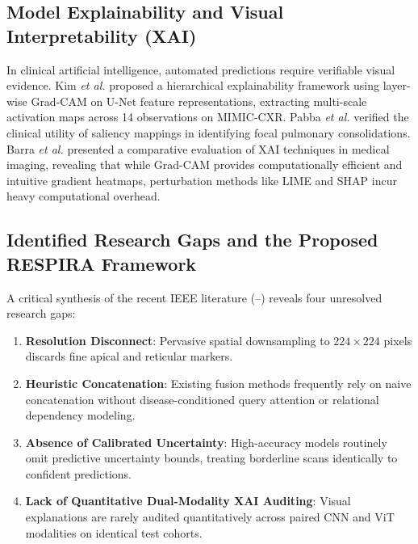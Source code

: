 \documentclass[journal]{IEEEtran}
\begin{document}
\subsection{Model Explainability and Visual Interpretability (XAI)}
In clinical artificial intelligence, automated predictions require verifiable visual evidence. Kim \textit{et al.} \cite{kim2025explainable} proposed a hierarchical explainability framework using layer-wise Grad-CAM on U-Net feature representations, extracting multi-scale activation maps across 14 observations on MIMIC-CXR. Pabba \textit{et al.} \cite{pabba2025explainable} verified the clinical utility of saliency mappings in identifying focal pulmonary consolidations. Barra \textit{et al.} \cite{barra2024comparative} presented a comparative evaluation of XAI techniques in medical imaging, revealing that while Grad-CAM provides computationally efficient and intuitive gradient heatmaps, perturbation methods like LIME and SHAP incur heavy computational overhead.

\subsection{Identified Research Gaps and the Proposed RESPIRA Framework}
A critical synthesis of the recent IEEE literature (\cite{shukla2026chest}--\cite{yaligar2024state}) reveals four unresolved research gaps:
\begin{enumerate}
    \item \textbf{Resolution Disconnect}: Pervasive spatial downsampling to $224 \times 224$ pixels discards fine apical and reticular markers.
    \item \textbf{Heuristic Concatenation}: Existing fusion methods frequently rely on naive concatenation without disease-conditioned query attention or relational dependency modeling.
    \item \textbf{Absence of Calibrated Uncertainty}: High-accuracy models routinely omit predictive uncertainty bounds, treating borderline scans identically to confident predictions.
    \item \textbf{Lack of Quantitative Dual-Modality XAI Auditing}: Visual explanations are rarely audited quantitatively across paired CNN and ViT modalities on identical test cohorts.
\end{enumerate}
\end{document}
